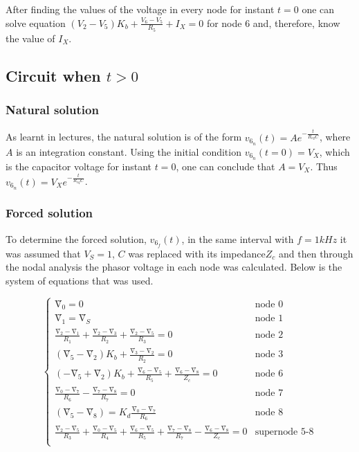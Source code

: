 After finding the values of the voltage in every node for instant $t=0$ one can solve equation $(V_2-V_5)K_b + \frac{V_6-V_5}{R_5} + I_X = 0$ for node 6 and, therefore, know the value of $I_X$.





\subsection{Circuit when $t>0$}

\subsubsection{Natural solution}  %
As learnt in lectures, the natural solution is of the form $v_{6_{n}}(t) = A e^{-\frac{t}{R_{eq}C}}$, where $A$ is an integration constant.
Using the initial condition $v_{6_{n}}(t=0) = V_X$, which is the capacitor voltage for instant $t=0$, one can conclude that $A= V_X$. Thus $v_{6_{n}}(t) = V_X e^{-\frac{t}{R_{eq}C}}$.





\subsubsection{Forced solution}  %
To determine the forced solution, $v_{6_{f}}(t)$, in the same interval with $f=1kHz$ it was assumed that $V_S=1$, $C$ was replaced with its impedance$Z_c$ and then through the nodal analysis the phasor voltage in each node was calculated. Below is the system of equations that was used.


\begin{equation}
  \begin{cases}
  Ṽ_0 = 0 & \mbox{node 0} \\
   Ṽ_1 = Ṽ_S & \mbox{node 1} \\
  \frac{Ṽ_2-Ṽ_1}{R_1}+\frac{Ṽ_2-Ṽ_3}{R_2}+\frac{Ṽ_2-Ṽ_5}{R_3} = 0 & \mbox{node 2} \\
  (Ṽ_5-Ṽ_2)K_b + \frac{Ṽ_3-Ṽ_2}{R_2} = 0 & \mbox{node 3} \\
  (-Ṽ_5+Ṽ_2)K_b + \frac{Ṽ_6-Ṽ_5}{R_5} + \frac{Ṽ_6-Ṽ_8}{Z_c} = 0 & \mbox{node 6} \\
  \frac{Ṽ_0-Ṽ_7}{R_6} - \frac{Ṽ_7-Ṽ_8}{R_7} = 0 & \mbox{node 7} \\
  (Ṽ_5-Ṽ_8) = K_d \frac{Ṽ_0-Ṽ_7}{R_6} & \mbox{node 8} \\
  \frac{Ṽ_2-Ṽ_5}{R_3} + \frac{Ṽ_0-Ṽ_5}{R_4} + \frac{Ṽ_6-Ṽ_5}{R_5} + \frac{Ṽ_7-Ṽ_8}{R_7} - \frac{Ṽ_6-Ṽ_8}{Z_c} = 0 & \mbox{supernode 5-8} \\ 
  \end{cases}
\end{equation}

